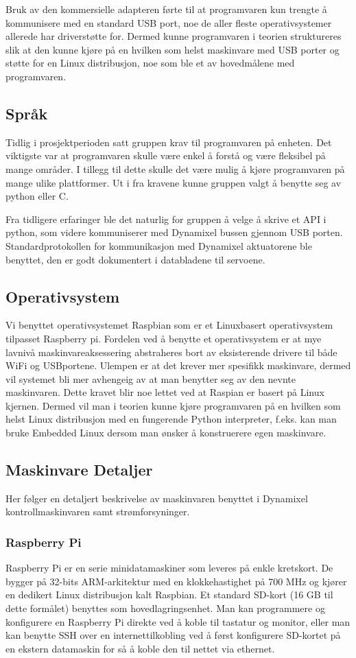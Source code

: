 \documentclass[12pt]{report}
\begin{document}
Bruk av den kommersielle adapteren førte til at programvaren kun trengte å kommunisere med en standard USB port, noe de aller fleste operativsystemer allerede har driverstøtte for. Dermed kunne programvaren i teorien struktureres slik at den kunne kjøre på en hvilken som helst maskinvare med USB porter og støtte for en Linux distribusjon, noe som ble et av hovedmålene med programvaren.

\subsection{Språk}
Tidlig i prosjektperioden satt gruppen krav til programvaren på enheten. Det viktigste var at programvaren skulle være enkel å forstå og være fleksibel på mange områder. I tillegg til dette skulle det være mulig å kjøre programvaren på mange ulike plattformer. Ut i fra kravene kunne gruppen valgt å benytte seg av python eller C. 

Fra tidligere erfaringer ble det naturlig for gruppen å velge å skrive et API i python, som videre kommuniserer med Dynamixel bussen gjennom USB porten. Standardprotokollen for kommunikasjon med Dynamixel aktuatorene ble benyttet, den er godt dokumentert i databladene til servoene\cite{Dynamixel}. 

\subsection{Operativsystem}
Vi benyttet operativsystemet Raspbian som er et Linuxbasert operativsystem tilpasset Raspberry pi. Fordelen ved å benytte et operativsystem er at mye lavnivå maskinvareaksessering abstraheres bort av eksisterende drivere til både WiFi og USBportene. Ulempen er at det krever mer spesifikk maskinvare, dermed vil systemet bli mer avhengeig av at man benytter seg av den nevnte maskinvaren. Dette kravet blir noe lettet ved at Raspian er basert på Linux kjernen. Dermed vil man i teorien kunne kjøre programvaren på en hvilken som helst Linux distribusjon med en fungerende Python interpreter, f.eks. kan man bruke Embedded Linux dersom man ønsker å konstruerere egen maskinvare.

\subsection{Maskinvare Detaljer}
Her følger en detaljert beskrivelse av maskinvaren benyttet i Dynamixel kontrollmaskinvaren samt strømforsyninger.

\subsubsection{Raspberry Pi}Raspberry Pi er en serie minidatamaskiner som leveres på enkle kretskort. De bygger på 32-bits ARM-arkitektur med en klokkehastighet på 700 MHz og kjører en dedikert Linux distribusjon kalt Raspbian. Et standard SD-kort (16 GB til dette formålet) benyttes som hovedlagringsenhet. Man kan programmere og konfigurere en Raspberry Pi direkte ved å koble til tastatur og monitor, eller man kan benytte SSH over en internettilkobling ved å først konfigurere SD-kortet på en ekstern datamaskin for så å koble den til nettet via ethernet.
\end{document}
